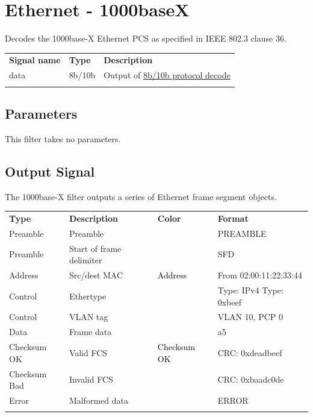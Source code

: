 \pagebreak
\section{Ethernet - 1000baseX}
\label{proto:1000basex}

Decodes the 1000base-X Ethernet PCS as specified in IEEE 802.3 clause 36.

\begin{tabularx}{16cm}{llX}
\thickhline
\textbf{Signal name} & \textbf{Type} & \textbf{Description} \\
\thickhline
data & 8b/10b & Output of \hyperref[proto:8b10b]{8b/10b protocol decode}\\
\thickhline
\end{tabularx}

\subsection{Parameters}

This filter takes no parameters.

\subsection{Output Signal}

The 1000base-X filter outputs a series of Ethernet frame segment objects.

\begin{tabularx}{16cm}{lllX}
\thickhline
\textbf{Type} & \textbf{Description} & \textbf{Color} & \textbf{Format} \\
\thickhline
Preamble & Preamble & \cellcolor{preamble}\textcolor{white}{Preamble} & PREAMBLE \\
\thickhline
Preamble & Start of frame delimiter & \cellcolor{preamble}\textcolor{white}{Preamble} & SFD \\
\thickhline
Address & Src/dest MAC & \cellcolor{address}\textcolor{black}{Address} & From 02:00:11:22:33:44 \\
\thickhline
Control & Ethertype & \cellcolor{control}\textcolor{white}{Control} & Type: IPv4 \newline Type: 0xbeef \\
\thickhline
Control & VLAN tag & \cellcolor{control}\textcolor{white}{Control} & VLAN 10, PCP 0 \\
\thickhline
Data & Frame data & \cellcolor{data}\textcolor{white}{Data} & a5 \\
\thickhline
Checksum OK & Valid FCS & \cellcolor{checksumok}\textcolor{black}{Checksum OK} & CRC: 0xdeadbeef \\
\thickhline
Checksum Bad & Invalid FCS & \cellcolor{checksumbad}\textcolor{white}{Checksum Bad} & CRC: 0xbaadc0de \\
\thickhline
Error & Malformed data & \cellcolor{error}\textcolor{white}{Error} & ERROR \\
\thickhline
\end{tabularx}


